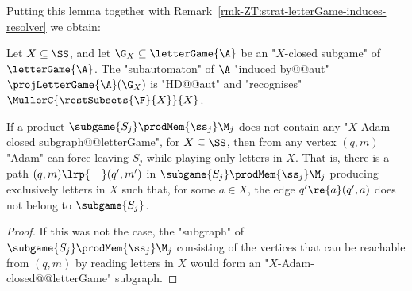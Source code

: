 \documentclass{theoretics}
\begin{document}
Putting this lemma together with Remark~\ref{rmk-ZT:strat-letterGame-induces-resolver} we obtain:
\begin{lemma}\label{lemma-ZT:Ai-closed-sets-induce-HD-automata}
	Let $X\subseteq \SS$, and let $\G_X \subseteq \letterGame{\A}$ be an "$X$-closed subgame" of $\letterGame{\A}$. The "subautomaton" of $\A$ "induced by@@aut" $\projLetterGame{\A}(\G_X)$ is "HD@@aut" and "recognises" $\MullerC{\restSubsets{\F}{X}}{X}$. 
\end{lemma}


\begin{lemma}\label{lemma-ZT:exist-X-closed-regions}
	If a product $\subgame{S_j} \prodMem{\ss_j} \M_j$ does not contain any "$X$-Adam-closed subgraph@@letterGame", for $X\subseteq \SS$, then from any vertex $(q,m)$ "Adam" can force leaving $S_j$ while playing only letters in $X$. 
	That is, there is a path $(q,m)\lrp{\phantom{w.}} (q',m')$ in $\subgame{S_j} \prodMem{\ss_j} \M_j$ producing exclusively letters in $X$ such that, for some $a\in X$, the edge $q'\re{a} (q',a)$ does not belong to $\subgame{S_j}$. 
\end{lemma}
\begin{proof}
	If this was not the case, the "subgraph" of $\subgame{S_j} \prodMem{\ss_j} \M_j$ consisting of the vertices that can be reachable from $(q,m)$ by reading letters in $X$ would form an "$X$-Adam-closed@@letterGame" subgraph.
\end{proof}
\end{document}
